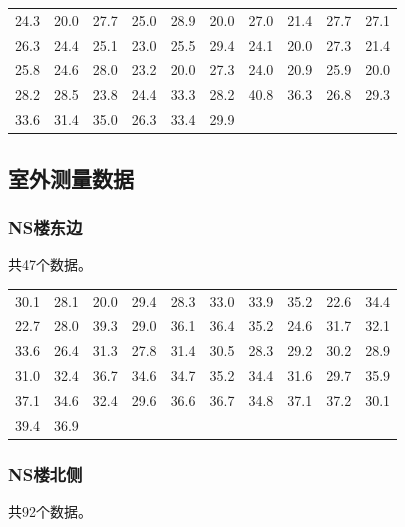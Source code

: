 \documentclass{../ElectromagneticFieldTemplate}
\begin{document}
\begin{longtable}[c]{*{10}{c}}
24.3 & 20.0 & 27.7 & 25.0 & 28.9 & 20.0 & 27.0 & 21.4 & 27.7 & 27.1 \\
26.3 & 24.4 & 25.1 & 23.0 & 25.5 & 29.4 & 24.1 & 20.0 & 27.3 & 21.4 \\
25.8 & 24.6 & 28.0 & 23.2 & 20.0 & 27.3 & 24.0 & 20.9 & 25.9 & 20.0 \\
28.2 & 28.5 & 23.8 & 24.4 & 33.3 & 28.2 & 40.8 & 36.3 & 26.8 & 29.3 \\
33.6 & 31.4 & 35.0 & 26.3 & 33.4 & 29.9 & & & & \\
\end{longtable}

\subsection{室外测量数据}

\subsubsection{NS楼东边}
共47个数据。

\begin{longtable}[c]{*{10}{c}}
30.1 & 28.1 & 20.0 & 29.4 & 28.3 & 33.0 & 33.9 & 35.2 & 22.6 & 34.4 \\
22.7 & 28.0 & 39.3 & 29.0 & 36.1 & 36.4 & 35.2 & 24.6 & 31.7 & 32.1 \\
33.6 & 26.4 & 31.3 & 27.8 & 31.4 & 30.5 & 28.3 & 29.2 & 30.2 & 28.9 \\
31.0 & 32.4 & 36.7 & 34.6 & 34.7 & 35.2 & 34.4 & 31.6 & 29.7 & 35.9 \\
37.1 & 34.6 & 32.4 & 29.6 & 36.6 & 36.7 & 34.8 & 37.1 & 37.2 & 30.1 \\
39.4 & 36.9 & & & & & & & & \\
\end{longtable}

\subsubsection{NS楼北侧}
共92个数据。
\end{document}
